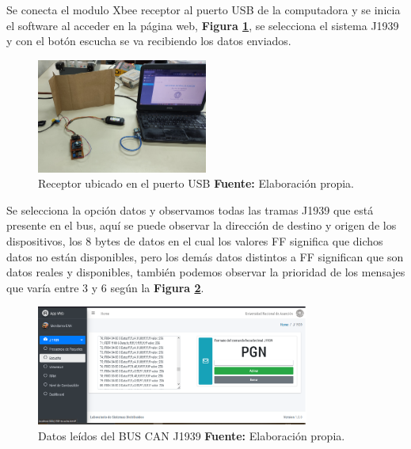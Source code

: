 Se conecta el modulo Xbee receptor al puerto USB de la computadora y se inicia el software al acceder en la página web, \textbf{Figura \ref{receptor_ref_c6}},  se selecciona el sistema J1939 y con el botón escucha se va recibiendo los datos enviados. 


\begin{figure}[H]
	\centering
	\includegraphics[width=0.5\textwidth]{./Cap6imagen/receptor_fig_c6.jpg}
	\caption [Receptor ubicado en el puerto USB.]{Receptor ubicado en el puerto USB \textbf{ Fuente:} %
		Elaboración propia.}
	\label{receptor_ref_c6} %
\end{figure}

Se selecciona la opción datos y observamos todas las tramas J1939 que está presente en el bus, aquí se puede observar la dirección de destino y origen de los dispositivos, los 8 bytes de datos en el cual los valores FF significa que dichos datos no están disponibles, pero los demás datos distintos a FF significan que son datos reales y disponibles, también podemos observar la prioridad de los mensajes que varía entre 3 y 6 según la \textbf{Figura \ref{escucha_ref_c6}}.

\begin{figure}[H]
	\centering
	\includegraphics[width=0.8\textwidth]{./Cap6imagen/escucha_fig_c6.png}
	\caption [Datos leídos del BUS CAN J1939.]{Datos leídos del BUS CAN J1939 \textbf{ Fuente:} %
		Elaboración propia.}
	\label{escucha_ref_c6} %
\end{figure}


